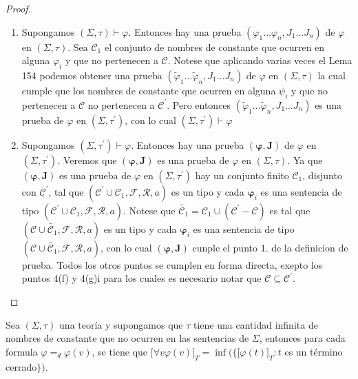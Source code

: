   \begin{proof}
    \PN \newline
    \begin{enumerate}[(1)]
      \item Supongamos $(\Sigma, \tau)\vdash \varphi $. Entonces hay una prueba $ (\varphi_{1}\dotsc\varphi_{n},J_{1}\dotsc J_{n})$ de $\varphi$ en $(\Sigma, \tau)$. Sea $\mathcal{C}_{1}$ el conjunto de nombres de constante que ocurren en alguna $\varphi_{i}$ y que no pertenecen a $\mathcal{C}.$ Notese que aplicando varias veces el Lema 154 podemos obtener una prueba $ (\tilde{\varphi}_{1}\dotsc\tilde{\varphi}_{n},J_{1}\dotsc J_{n})$ de $\varphi$ en $(\Sigma, \tau)$ la cual cumple que los nombres de constante que ocurren en alguna $\psi_{i}$ y que no pertenecen a $\mathcal{C}$ no pertenecen a $ \mathcal{C}^{\prime}$. Pero entonces $(\tilde{\varphi}_{1}\dotsc\tilde{\varphi} _{n},J_{1}\dotsc J_{n})$ es una prueba de $\varphi$ en $(\Sigma ,\tau ^{\prime})$, con lo cual $(\Sigma ,\tau ^{\prime})\vdash \varphi $

      \item Supongamos $(\Sigma ,\tau ^{\prime})\vdash \varphi $. Entonces hay una prueba $(\mathbf{\varphi },\mathbf{J})$ de $\varphi$ en $(\Sigma ,\tau ^{\prime})$. Veremos que $(\mathbf{\varphi },\mathbf{J})$ es una prueba de $\varphi$ en $(\Sigma, \tau)$. Ya que $(\mathbf{\varphi },\mathbf{J})$ es una prueba de $\varphi$ en $(\Sigma ,\tau ^{\prime})$ hay un conjunto finito $\mathcal{C}_{1}$, disjunto con $\mathcal{C}^{\prime}$, tal que $( \mathcal{C}^{\prime}\cup \mathcal{C}_{1},\mathcal{F},\mathcal{R},a)$ es un tipo y cada $\mathbf{\varphi }_{i}$ es una sentencia de tipo $(\mathcal{C} ^{\prime}\cup \mathcal{C}_{1},\mathcal{F},\mathcal{R},a)$. Notese que $ \widetilde{\mathcal{C}_{1}}=\mathcal{C}_{1}\cup (\mathcal{C}^{\prime}- \mathcal{C})$ es tal que $(\mathcal{C}\cup \widetilde{\mathcal{C}_{1}}, \mathcal{F},\mathcal{R},a)$ es un tipo y cada $\mathbf{\varphi }_{i}$ es una sentencia de tipo $(\mathcal{C}\cup \widetilde{\mathcal{C}_{1}},\mathcal{F}, \mathcal{R},a)$, con lo cual $(\mathbf{\varphi },\mathbf{J})$ cunple el punto 1. de la definicion de prueba. Todos los otros puntos se cumplen en forma directa, exepto los puntos 4(f) y 4(g)i para los cuales es necesario notar que $\mathcal{C}\subseteq \mathcal{C}^{\prime}$.
    \end{enumerate}
  \end{proof}

  \begin{lemma} \label{lemma_79}
    \PN Sea $(\Sigma, \tau)$ una teoría y supongamos que $\tau$ tiene una cantidad infinita de nombres de constante que
    no ocurren en las sentencias de $\Sigma$, entonces para cada formula $\varphi =_{d} \varphi(v)$, se tiene que
    $\lbrack \forall v\varphi (v) \rbrack_{T} = \inf(\{\lbrack \varphi(t) \rbrack_{T}: t$ es un término cerrado$\})$.
  \end{lemma}

